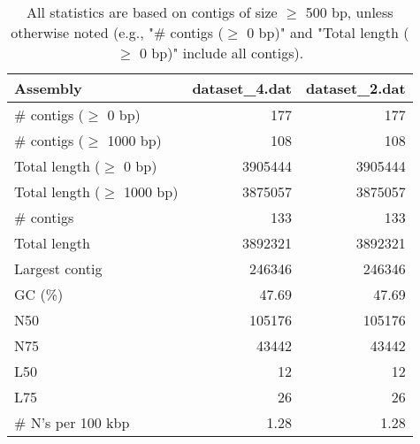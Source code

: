 \documentclass[12pt,a4paper]{article}
\begin{document}
\begin{table}[ht]
\begin{center}
\caption{All statistics are based on contigs of size $\geq$ 500 bp, unless otherwise noted (e.g., "\# contigs ($\geq$ 0 bp)" and "Total length ($\geq$ 0 bp)" include all contigs).}
\begin{tabular}{|l*{2}{|r}|}
\hline
Assembly & dataset\_4.dat & dataset\_2.dat \\ \hline
\# contigs ($\geq$ 0 bp) & 177 & 177 \\ \hline
\# contigs ($\geq$ 1000 bp) & 108 & 108 \\ \hline
Total length ($\geq$ 0 bp) & 3905444 & 3905444 \\ \hline
Total length ($\geq$ 1000 bp) & 3875057 & 3875057 \\ \hline
\# contigs & 133 & 133 \\ \hline
Total length & 3892321 & 3892321 \\ \hline
Largest contig & 246346 & 246346 \\ \hline
GC (\%) & 47.69 & 47.69 \\ \hline
N50 & 105176 & 105176 \\ \hline
N75 & 43442 & 43442 \\ \hline
L50 & 12 & 12 \\ \hline
L75 & 26 & 26 \\ \hline
\# N's per 100 kbp & 1.28 & 1.28 \\ \hline
\end{tabular}
\end{center}
\end{table}
\end{document}
